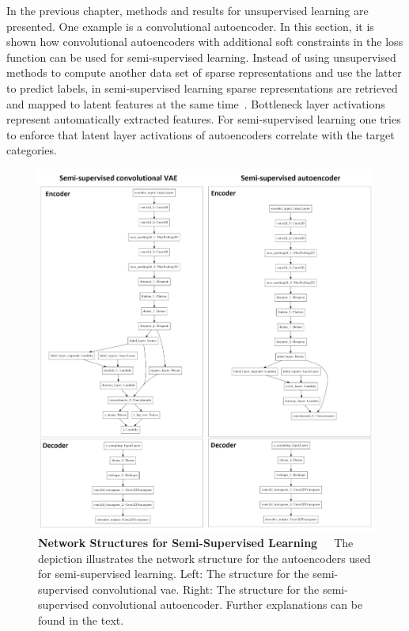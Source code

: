 \bigskip
In the previous chapter, methods and results for unsupervised learning are presented. One example is a convolutional autoencoder. In this section, it is shown how convolutional autoencoders with additional soft constraints in the loss function can be used for semi-supervised learning. Instead of using unsupervised methods to compute another data set of sparse representations and use the latter to predict labels, in semi-supervised learning sparse representations are retrieved and mapped to latent features at the same time~\citep{keng2017semi}. Bottleneck layer activations represent automatically extracted features. For semi-supervised learning one tries to enforce that latent layer activations of autoencoders correlate with the target categories.

\begin{figure}[!htb]
	\centering
	\includegraphics[scale=0.8]{Figures/chapter04/semi_supervised_network.png}
	\decoRule
	\caption[Semi-Supervised Autoencoders Network Structures]{\textbf{Network Structures for Semi-Supervised Learning}~~~The depiction illustrates the network structure for the autoencoders used for semi-supervised learning. Left: The structure for the semi-supervised convolutional \acrlong{vae}. Right: The structure for the semi-supervised convolutional autoencoder. Further explanations can be found in the text.}
	\label{fig:SemiSupervisedNetworkStructures}
\end{figure}

